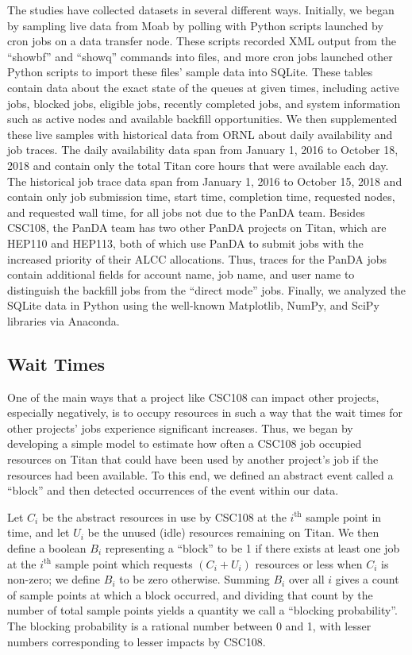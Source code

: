 The studies have collected datasets in several different ways. Initially, we
began by sampling live data from Moab by polling with Python scripts launched
by cron jobs on a data transfer node. These scripts recorded XML output from
the ``showbf'' and ``showq'' commands into files, and more cron jobs launched
other Python scripts to import these files' sample data into SQLite. These
tables contain data about the exact state of the queues at given times,
including active jobs, blocked jobs, eligible jobs, recently completed jobs,
and system information such as active nodes and available backfill
opportunities. We then supplemented these live samples with historical data
from ORNL about daily availability and job traces. The daily availability data
span from January 1, 2016 to October 18, 2018 and contain only the total Titan
core hours that were available each day. The historical job trace data span
from January 1, 2016 to October 15, 2018 and contain only job submission time,
start time, completion time, requested nodes, and requested wall time, for all
jobs not due to the PanDA team. Besides CSC108, the PanDA team has two other
PanDA projects on Titan, which are HEP110 and HEP113, both of which use PanDA
to submit jobs with the increased priority of their ALCC allocations. Thus,
traces for the PanDA jobs contain additional fields for account name, job name,
and user name to distinguish the backfill jobs from the ``direct mode'' jobs.
Finally, we analyzed the SQLite data in Python using the well-known Matplotlib,
NumPy, and SciPy libraries via Anaconda.

\subsection{Wait Times}
\label{subsec:waittimes}

One of the main ways that a project like CSC108 can impact other projects,
especially negatively, is to occupy resources in such a way that the wait times
for other projects' jobs experience significant increases. Thus, we began by
developing a simple model to estimate how often a CSC108 job occupied resources
on Titan that could have been used by another project's job if the resources
had been available. To this end, we defined an abstract event called a
``block'' and then detected occurrences of the event within our data.

Let $C_i$ be the abstract resources in use by CSC108 at the $i^{\text{th}}$
sample point in time, and let $U_i$ be the unused (idle) resources remaining on
Titan. We then define a boolean $B_i$ representing a ``block'' to be 1 if there
exists at least one job at the $i^{\text{th}}$ sample point which requests
$(C_i + U_i)$ resources or less when $C_i$ is non-zero; we define $B_i$ to be
zero otherwise. Summing $B_i$ over all $i$ gives a count of sample points at
which a block occurred, and dividing that count by the number of total sample
points yields a quantity we call a ``blocking probability''. The blocking
probability is a rational number between 0 and 1, with lesser numbers
corresponding to lesser impacts by CSC108.

